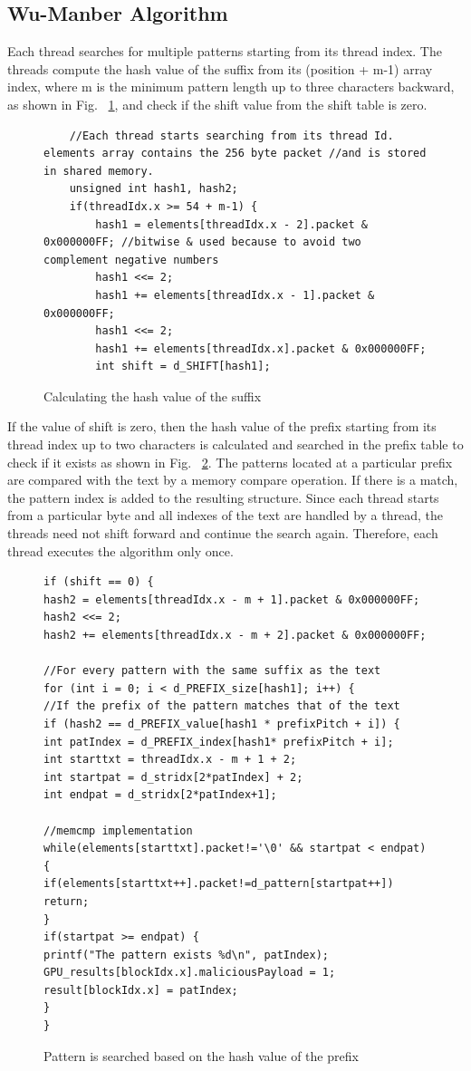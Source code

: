\subsection{Wu-Manber Algorithm}
Each thread searches for multiple patterns starting from its thread index. The threads compute the hash value of the suffix from its (position + m-1) array index, where m is the minimum pattern length up to three characters backward, as shown in Fig. ~\ref{fig:wumanstep1}, and check if the shift value from the shift table is zero. 

\begin{figure}[H]
	\begin{lstlisting}
	//Each thread starts searching from its thread Id. elements array contains the 256 byte packet //and is stored in shared memory.
	unsigned int hash1, hash2;
	if(threadIdx.x >= 54 + m-1) {
		hash1 = elements[threadIdx.x - 2].packet & 0x000000FF; //bitwise & used because to avoid two complement negative numbers
		hash1 <<= 2;
		hash1 += elements[threadIdx.x - 1].packet & 0x000000FF;
		hash1 <<= 2;
		hash1 += elements[threadIdx.x].packet & 0x000000FF;
		int shift = d_SHIFT[hash1];
	\end{lstlisting}
	\caption{Calculating the hash value of the suffix}
	\label{fig:wumanstep1}
\end{figure}
\squeezeup

If the value of shift is zero, then the hash value of the prefix starting from its thread index up to two characters is calculated and searched in the prefix table to check if it exists as shown in Fig. ~\ref{fig:wumanstep2}. The patterns located at a particular prefix are compared with the text by a memory compare operation. If there is a match, the pattern index is added to the resulting structure. Since each thread starts from a particular byte and all indexes of the text are handled by a thread, the threads need not shift forward and continue the search again. Therefore, each thread executes the algorithm only once.

\begin{figure}[H]
	\begin{lstlisting}
if (shift == 0) {
hash2 = elements[threadIdx.x - m + 1].packet & 0x000000FF;
hash2 <<= 2;
hash2 += elements[threadIdx.x - m + 2].packet & 0x000000FF;

//For every pattern with the same suffix as the text
for (int i = 0; i < d_PREFIX_size[hash1]; i++) {	
//If the prefix of the pattern matches that of the text
if (hash2 == d_PREFIX_value[hash1 * prefixPitch + i]) {
int patIndex = d_PREFIX_index[hash1* prefixPitch + i];
int starttxt = threadIdx.x - m + 1 + 2;
int startpat = d_stridx[2*patIndex] + 2;
int endpat = d_stridx[2*patIndex+1];

//memcmp implementation
while(elements[starttxt].packet!='\0' && startpat < endpat) {
if(elements[starttxt++].packet!=d_pattern[startpat++]) return;
}
if(startpat >= endpat) { 
printf("The pattern exists %d\n", patIndex);
GPU_results[blockIdx.x].maliciousPayload = 1;
result[blockIdx.x] = patIndex;
}
}
	\end{lstlisting}
	\caption{Pattern is searched based on the hash value of the prefix}
	\label{fig:wumanstep2}
\end{figure}
\squeezeup

